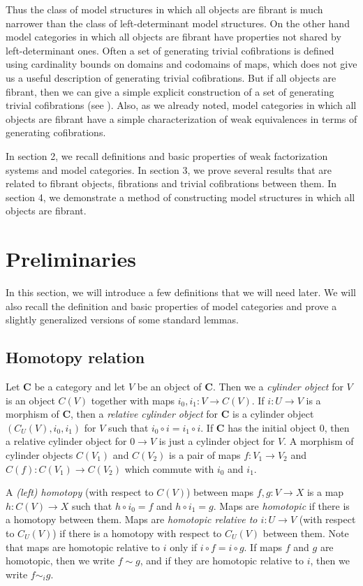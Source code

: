 \documentclass[reqno]{amsart}
\theoremstyle{definition}
\newcommand{\cat}[1]{\mathbf{#1}}
\newcommand{\C}{\cat{C}}
\newcommand{\cyli}{i}
\begin{document}
Thus the class of model structures in which all objects are fibrant is much narrower than the class of left-determinant model structures.
On the other hand model categories in which all objects are fibrant have properties not shared by left-determinant ones.
Often a set of generating trivial cofibrations is defined using cardinality bounds on domains and codomains of maps,
which does not give us a useful description of generating trivial cofibrations.
But if all objects are fibrant, then we can give a simple explicit construction of a set of generating trivial cofibrations (see ).
Also, as we already noted, model categories in which all objects are fibrant have a simple characterization of weak equivalences in terms of generating cofibrations.

In section 2, we recall definitions and basic properties of weak factorization systems and model categories.
In section 3, we prove several results that are related to fibrant objects, fibrations and trivial cofibrations between them.
In section 4, we demonstrate a method of constructing model structures in which all objects are fibrant.

\section{Preliminaries}

In this section, we will introduce a few definitions that we will need later.
We will also recall the definition and basic properties of model categories and prove a slightly generalized versions of some standard lemmas.

\subsection{Homotopy relation}

Let $\C$ be a category and let $V$ be an object of $\C$.
Then we a \emph{cylinder object} for $V$ is an object $C(V)$ together with maps $\cyli_0,\cyli_1 : V \to C(V)$.
If $i : U \to V$ is a morphism of $\C$, then a \emph{relative cylinder object} for $\C$
is a cylinder object $(C_U(V),\cyli_0,\cyli_1)$ for $V$ such that $\cyli_0 \circ i = \cyli_1 \circ i$.
If $\C$ has the initial object $0$, then a relative cylinder object for $0 \to V$ is just a cylinder object for $V$.
A morphism of cylinder objects $C(V_1)$ and $C(V_2)$ is a pair of maps $f : V_1 \to V_2$ and $C(f) : C(V_1) \to C(V_2)$ which commute with $\cyli_0$ and $\cyli_1$.

A \emph{(left) homotopy} (with respect to $C(V)$) between maps $f,g : V \to X$ is a map $h : C(V) \to X$ such that $h \circ \cyli_0 = f$ and $h \circ \cyli_1 = g$.
Maps are \emph{homotopic} if there is a homotopy between them.
Maps are \emph{homotopic relative to $i : U \to V$} (with respect to $C_U(V)$) if there is a homotopy with respect to $C_U(V)$ between them.
Note that maps are homotopic relative to $i$ only if $i \circ f = i \circ g$.
If maps $f$ and $g$ are homotopic, then we write $f \sim g$, and if they are homotopic relative to $i$, then we write $f \sim_i g$.
\end{document}
